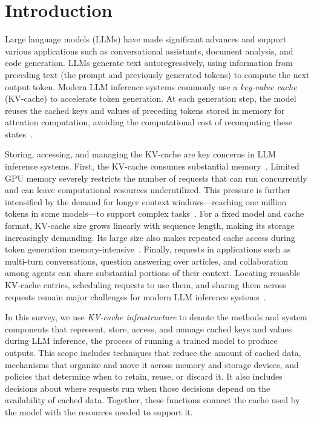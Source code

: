 \chapter{Introduction}\label{chapter:introduction}

Large language models (LLMs) have made significant advances and support various applications such as conversational assistants, document analysis, and code generation. LLMs generate text autoregressively, using information from preceding text (the prompt and previously generated tokens) to compute the next output token. Modern LLM inference systems commonly use a \emph{key-value cache} (KV-cache) to accelerate token generation. At each generation step, the model reuses the cached keys and values of preceding tokens stored in memory for attention computation, avoiding the computational cost of recomputing these states~\cite{kv_kwon2023pagedattention}.

Storing, accessing, and managing the KV-cache are key concerns in LLM inference systems. First, the KV-cache consumes substantial memory~\cite{kv_kwon2023pagedattention,kv_liu2024kivi}. Limited GPU memory severely restricts the number of requests that can run concurrently and can leave computational resources underutilized. This pressure is further intensified by the demand for longer context windows---reaching one million tokens in some models---to support complex tasks~\cite{kv_yang2025contextparallelism}. For a fixed model and cache format, KV-cache size grows linearly with sequence length, making its storage increasingly demanding. Its large size also makes repeated cache access during token generation memory-intensive~\cite{kv_liu2024kivi}. Finally, requests in applications such as multi-turn conversations, question answering over articles, and collaboration among agents can share substantial portions of their context. Locating reusable KV-cache entries, scheduling requests to use them, and sharing them across requests remain major challenges for modern LLM inference systems~\cite{kv_zheng2024sglang,kv_qin2025mooncake}.

In this survey, we use \emph{KV-cache infrastructure} to denote the methods and system components that represent, store, access, and manage cached keys and values during LLM inference, the process of running a trained model to produce outputs. This scope includes techniques that reduce the amount of cached data, mechanisms that organize and move it across memory and storage devices, and policies that determine when to retain, reuse, or discard it. It also includes decisions about where requests run when those decisions depend on the availability of cached data. Together, these functions connect the cache used by the model with the resources needed to support it.

